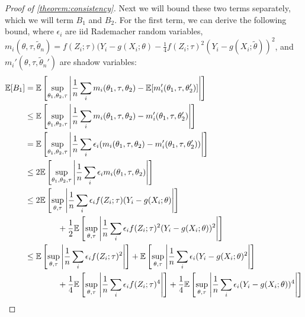 \documentclass{article}
\theoremstyle{plain}
\theoremstyle{definition}
\begin{document}
\begin{proof}[Proof of \cref{theorem:consistency}]
Next we will bound these two terms separately, which we will term $B_1$ and $B_2$. For the first term, we can derive the following bound, where $\epsilon_i$ are iid Rademacher random variables, $m_i(\theta, \tau, \tilde\theta_n) = f(Z_i; \tau)(Y_i - g(X_i; \theta) - \frac{1}{4}f(Z_i;\tau)^2(Y_i-g(X_i;\tilde\theta))^2$, and $m_i'(\theta, \tau, \tilde\theta_n')$ are shadow variables:
\begin{align*}
    \mathbb{E}[B_1] &= \mathbb{E}\left[ \sup_{\theta_1,\theta_2,\tau} \left|\frac{1}{n} \sum_i m_i(\theta_1,\tau,\theta_2) - \mathbb{E}[m_i'(\theta_1,\tau,\theta_2')]\right| \right] \\
    &\leq \mathbb{E}\left[ \sup_{\theta_1,\theta_2,\tau} \left|\frac{1}{n} \sum_i m_i(\theta_1,\tau,\theta_2) - m_i'(\theta_1,\tau,\theta_2')\right| \right] \\
    &= \mathbb{E}\left[ \sup_{\theta_1,\theta_2,\tau} \left|\frac{1}{n} \sum_i \epsilon_i (m_i(\theta_1,\tau,\theta_2) - m_i'(\theta_1,\tau,\theta_2'))\right| \right] \\
    &\leq 2 \mathbb{E}\left[ \sup_{\theta_1,\theta_2,\tau} \left|\frac{1}{n} \sum_i \epsilon_i m_i(\theta_1,\tau,\theta_2)\right| \right] \\
    &\leq 2 \mathbb{E}\left[ \sup_{\theta,\tau} \left|\frac{1}{n} \sum_i \epsilon_i f(Z_i; \tau)(Y_i - g(X_i; \theta) \right|\right] \\
    &\qquad\qquad + \frac{1}{2} \mathbb{E}\left[ \sup_{\theta,\tau} \left| \frac{1}{n} \sum_i \epsilon_i f(Z_i;\tau)^2(Y_i-g(X_i;\theta))^2\right| \right] \\
    &\leq \mathbb{E}\left[ \sup_{\theta,\tau} \left|\frac{1}{n} \sum_i \epsilon_i f(Z_i; \tau)^2\right|\right] + \mathbb{E}\left[ \sup_{\theta,\tau} \left|\frac{1}{n} \sum_i \epsilon_i (Y_i - g(X_i; \theta)^2 \right|\right] \\
    &\qquad\qquad + \frac{1}{4} \mathbb{E}\left[ \sup_{\theta,\tau} \left| \frac{1}{n} \sum_i \epsilon_i f(Z_i;\tau)^4\right| \right] + \frac{1}{4} \mathbb{E}\left[ \sup_{\theta,\tau} \left| \frac{1}{n} \sum_i \epsilon_i (Y_i-g(X_i;\theta))^4\right| \right] 
\end{align*}


\end{proof}
\end{document}
